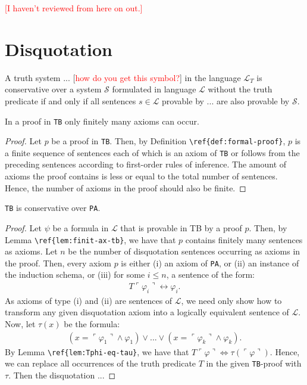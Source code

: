 \noindent \textcolor{red}{[I haven't reviewed from here on out.]}

\section{Disquotation}\label{subsec:disquotation}
\begin{definition}[conservativity]
    A truth system $...$ [\textcolor{red}{how do you get this symbol?}] in the language $\mathcal{L}_T$ is conservative over a system $\mathcal{S}$ formulated in language $\mathcal{L}$ without the truth predicate if and only if all sentences $s \in \mathcal{L}$ provable by $...$ are also provable by $\mathcal{S}$.
\end{definition}

\begin{lemma}
    In a proof in \texttt{TB} only finitely many axioms can occur.
\end{lemma}

\begin{proof}
    Let $p$ be a proof in \texttt{TB}. Then, by Definition \verb|\ref{def:formal-proof}|, $p$ is a finite sequence of sentences each of which is an axiom of \texttt{TB} or follows from the preceding sentences according to first-order rules of inference. The amount of axioms the proof contains is less or equal to the total number of sentences. Hence, the number of axioms in the proof should also be finite. 
\end{proof}

\begin{theorem}
    \texttt{TB} is conservative over \texttt{PA}.
\end{theorem}

\begin{proof}
Let $\psi$ be a formula in $\mathcal{L}$ that is provable in TB by a proof $p$. Then, by Lemma \verb|\ref{lem:finit-ax-tb}|, we have that $p$ contains finitely many sentences as axioms. Let $n$ be the number of disquotation sentences occurring as axioms in the proof. Then, every axiom $p$ is either (i) an axiom of \texttt{PA}, or (ii) an instance of the induction schema, or (iii) for some $i \leq n$, a sentence of the form: 
\begin{align*}
    T\ulcorner \varphi_i \urcorner \leftrightarrow \varphi_i.
\end{align*}
As axioms of type (i) and (ii) are sentences of $\mathcal{L}$, we need only show how to transform any given disquotation axiom into a logically equivalent sentence of $\mathcal{L}$. Now, let $\tau(x)$ be the formula: 
\begin{align*}
    (x = \ulcorner \varphi_1 \urcorner \land \varphi_1) \lor ... \lor (x = \ulcorner \varphi_k \urcorner \land \varphi_k).
\end{align*}
By Lemma \verb|\ref{lem:Tphi-eq-tau}|, we have that $T\ulcorner \varphi \urcorner \iff \tau(\ulcorner \varphi \urcorner)$. Hence, we can replace all occurrences of the truth predicate $T$ in the given \texttt{TB}-proof with $\tau$. Then the disquotation ...
\end{proof}

